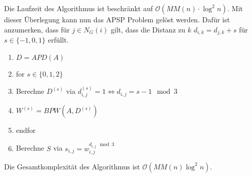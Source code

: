 \documentclass[a4paper, 12pt]{article}
\theoremstyle{plain}
\theoremstyle{definition}
\theoremstyle{lemma}
\theoremstyle{remark}
\theoremstyle{corollary}
\theoremstyle{example}
\begin{document}
	Die Laufzeit des Algorithmus ist beschränkt auf $\mathcal{O}(MM(n) \cdot \log^2 n)$.
	Mit dieser Überlegung kann nun das APSP Problem gelöst werden. Dafür ist anzumerken, dass für $j \in N_G(i)$ gilt, dass die Distanz zu $k$ $d_{i,k} = d_{j,k} + s$ für $s \in \{-1,0,1\}$ erfüllt.\\
	\begin{enumerate}
		\item $D = APD(A)$
		\item for $s \in \{0,1,2\}$
		\item Berechne $D^{(s)}$ via $d_{i,j}^{(s)} = 1 \Leftrightarrow d_{i,j} = s-1 \mod 3$
		\item $W^{(s)} = BPW(A,D^{(s)})$
		\item endfor
		\item Berechne $S$ via $s_{i,j} = w_{i,j}^{d_{i,j} \mod 3}$
	\end{enumerate}
	Die Gesamtkomplexität des Algorithmus ist $\mathcal{O}(MM(n) \log^2 n)$.
\end{document}
